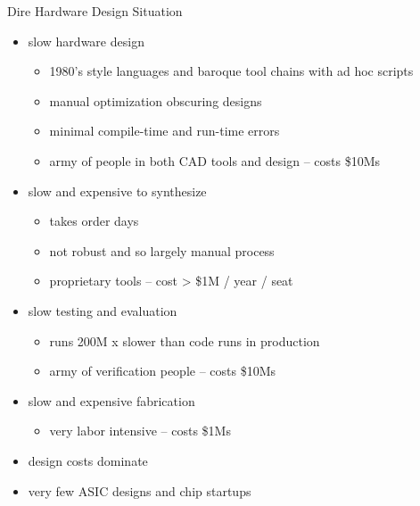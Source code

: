 \documentclass[xcolor=pdflatex,dvipsnames,table]{beamer}
\begin{document}
\begin{frame}[fragile]{Dire Hardware Design Situation}
\begin{itemize}
\item slow hardware design
\begin{itemize}
\item 1980's style languages and baroque tool chains with ad hoc scripts
\item manual optimization obscuring designs
\item minimal compile-time and run-time errors
\item army of people in both CAD tools and design -- costs \$10Ms
\end{itemize}
\item slow and expensive to synthesize
\begin{itemize}
\item takes order days
\item not robust and so largely manual process
\item proprietary tools -- cost > \$1M / year / seat
\end{itemize}
\item slow testing and evaluation
\begin{itemize}
\item runs 200M x slower than code runs in production
\item army of verification people -- costs \$10Ms
\end{itemize}
\item slow and expensive fabrication
\begin{itemize}
\item very labor intensive -- costs \$1Ms \\[0.5cm]
\end{itemize}
\item {\color{red}design costs dominate}
\item {\color{red}very few ASIC designs and chip startups}
\end{itemize}
\end{frame}
\end{document}
